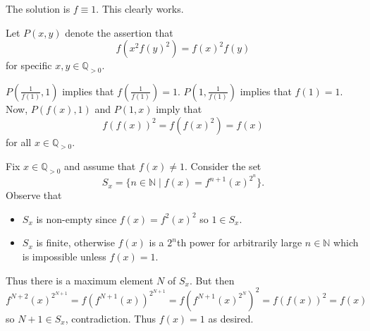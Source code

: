 The solution is $f\equiv1$. This clearly works.

Let $P(x,y)$ denote the assertion that \[f(x^2f(y)^2)=f(x)^2f(y)\] for specific $x,y\in\mathbb{Q}_{>0}$.

$P(\frac{1}{f(1)},1)$ implies that $f\left(\frac{1}{f(1)}\right)=1$. $P(1,\frac{1}{f(1)})$ implies that $f(1)=1$. Now, $P(f(x),1)$ and $P(1,x)$ imply that \[f(f(x))^2=f(f(x)^2)=f(x)\] for all $x\in\mathbb{Q}_{>0}$.

Fix $x\in\mathbb{Q}_{>0}$ and assume that $f(x)\neq1$. Consider the set \[S_x=\{n\in\mathbb{N}\mid f(x)=f^{n+1}(x)^{2^n}\}.\] Observe that
\begin{itemize}
	\item $S_x$ is non-empty since $f(x)=f^2(x)^2$ so $1\in S_x$.
	\item $S_x$ is finite, otherwise $f(x)$ is a $2^n$th power for arbitrarily large $n\in\mathbb{N}$ which is impossible unless $f(x)=1$.
\end{itemize}
Thus there is a maximum element $N$ of $S_x$. But then \[f^{N+2}(x)^{2^{N+1}}=f\left(f^{N+1}(x)\right)^{2^{N+1}}=f\left(f^{N+1}(x)^{2^N}\right)^2=f(f(x))^2=f(x)\] so $N+1\in S_x$, contradiction. Thus $f(x)=1$ as desired.